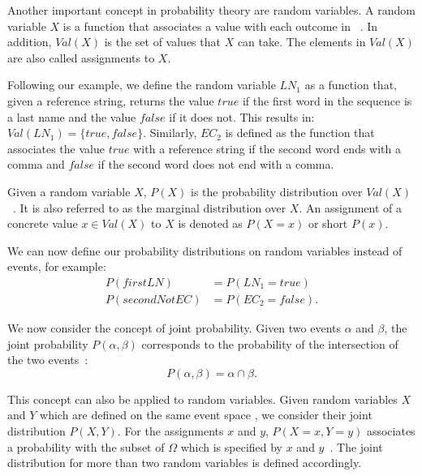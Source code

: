 \bigskip

Another important concept in probability theory are \glspl{random variable}.
A \gls{random variable} $X$ is a \gls{function} that associates a value with each outcome in ~\cite{koller2009probabilistic}.
In addition, $\mathit{Val}(X)$ is the set of values that $X$ can take.
The elements in $\mathit{Val}(X)$ are also called \glspl{assignment} to $X$.

Following our example, we define the \gls{random variable} $LN_1$ as a \gls{function} that, given a reference string, returns the value $\mathit{true}$ if the first word in the sequence is a last name and the value $\mathit{false}$ if it does not.
This results in: $\mathit{Val}(LN_1)=\{\mathit{true}, \mathit{false}\}$.
Similarly, $EC_2$ is defined as the function that associates the value $\mathit{true}$ with a reference string if the second word ends with a comma and $\mathit{false}$ if the second word does not end with a comma.

\bigskip

Given a \gls{random variable} $X$, $P(X)$ is the \gls{probability distribution} over $\mathit{Val}(X)$~\cite{koller2009probabilistic}.
It is also referred to as the \gls{marginal distribution} over $X$.
An \gls{assignment} of a concrete value $x\in \mathit{Val}(X)$ to $X$ is denoted as $P(X=x)$ or short $P(x)$.

We can now define our \glspl{probability distribution} on \glspl{random variable} instead of \glspl{event}, for example:
\begin{equation*}
  \begin{split}
    P(\mathit{firstLN})&= P(LN_1{=}\mathit{true})\\
    P(\mathit{secondNotEC})&= P(EC_2{=}\mathit{false}).
  \end{split}
\end{equation*}

\bigskip

We now consider the concept of \gls{joint probability}.
Given two \glspl{event} $\alpha$ and $\beta$, the \gls{joint probability} $P(\alpha,\beta)$ corresponds to the probability of the intersection of the two events~\citep{teschl2007mathematik}:
\begin{equation*}
  P(\alpha,\beta)=\alpha\cap\beta.
\end{equation*}

This concept can also be applied to \glspl{random variable}.
Given \glspl{random variable} $X$ and $Y$ which are defined on the same \gls{event space} , we consider their \gls{joint distribution} $P(X,Y)$.
For the \glspl{assignment} $x$ and $y$, $P(X{=}x,Y{=}y)$ associates a probability with the subset of $\Omega$ which is specified by  $x$ and $y$~\citep{koller2009probabilistic}.
The \gls{joint distribution} for more than two \glspl{random variable} is defined accordingly.

